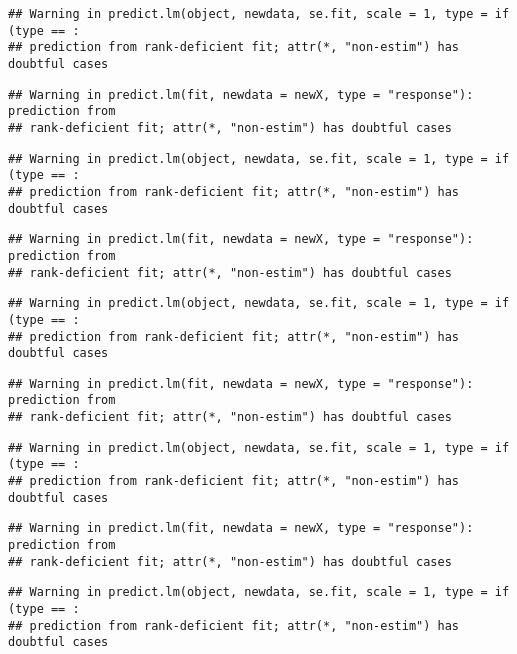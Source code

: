 \documentclass[
]{article}
\begin{document}
\begin{verbatim}
## Warning in predict.lm(object, newdata, se.fit, scale = 1, type = if (type == :
## prediction from rank-deficient fit; attr(*, "non-estim") has doubtful cases
\end{verbatim}

\begin{verbatim}
## Warning in predict.lm(fit, newdata = newX, type = "response"): prediction from
## rank-deficient fit; attr(*, "non-estim") has doubtful cases
\end{verbatim}

\begin{verbatim}
## Warning in predict.lm(object, newdata, se.fit, scale = 1, type = if (type == :
## prediction from rank-deficient fit; attr(*, "non-estim") has doubtful cases
\end{verbatim}

\begin{verbatim}
## Warning in predict.lm(fit, newdata = newX, type = "response"): prediction from
## rank-deficient fit; attr(*, "non-estim") has doubtful cases
\end{verbatim}

\begin{verbatim}
## Warning in predict.lm(object, newdata, se.fit, scale = 1, type = if (type == :
## prediction from rank-deficient fit; attr(*, "non-estim") has doubtful cases
\end{verbatim}

\begin{verbatim}
## Warning in predict.lm(fit, newdata = newX, type = "response"): prediction from
## rank-deficient fit; attr(*, "non-estim") has doubtful cases
\end{verbatim}

\begin{verbatim}
## Warning in predict.lm(object, newdata, se.fit, scale = 1, type = if (type == :
## prediction from rank-deficient fit; attr(*, "non-estim") has doubtful cases
\end{verbatim}

\begin{verbatim}
## Warning in predict.lm(fit, newdata = newX, type = "response"): prediction from
## rank-deficient fit; attr(*, "non-estim") has doubtful cases
\end{verbatim}

\begin{verbatim}
## Warning in predict.lm(object, newdata, se.fit, scale = 1, type = if (type == :
## prediction from rank-deficient fit; attr(*, "non-estim") has doubtful cases
\end{verbatim}
\end{document}
